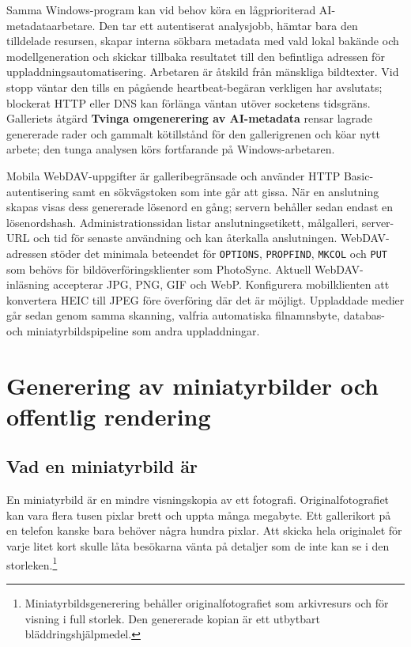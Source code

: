 \documentclass[11pt,a4paper]{article}
\newcommand{\ui}[1]{\textbf{#1}}
\newcommand{\codeword}[1]{\nolinkurl{#1}}
\begin{document}
Samma Windows-program kan vid behov köra en lågprioriterad AI-metadataarbetare.
Den tar ett autentiserat analysjobb, hämtar bara den tilldelade resursen, skapar
interna sökbara metadata med vald lokal bakände och modellgeneration och skickar
tillbaka resultatet till den befintliga adressen för uppladdningsautomatisering.
Arbetaren är åtskild från mänskliga bildtexter. Vid stopp väntar den tills en
pågående heartbeat-begäran verkligen har avslutats; blockerat HTTP eller DNS
kan förlänga väntan utöver socketens tidsgräns. Galleriets åtgärd \ui{Tvinga
omgenerering av AI-metadata} rensar lagrade genererade rader och gammalt
kötillstånd för den gallerigrenen och köar nytt arbete; den tunga analysen körs
fortfarande på Windows-arbetaren.

Mobila WebDAV-uppgifter är galleribegränsade och använder HTTP
Basic-autentisering samt en sökvägstoken som inte går att gissa. När en
anslutning skapas visas dess genererade lösenord en gång; servern behåller sedan
endast en lösenordshash. Administrationssidan listar anslutningsetikett,
målgalleri, server-URL och tid för senaste användning och kan återkalla
anslutningen. WebDAV-adressen stöder det minimala beteendet för
\codeword{OPTIONS}, \codeword{PROPFIND}, \codeword{MKCOL} och \codeword{PUT} som
behövs för bildöverföringsklienter som PhotoSync. Aktuell WebDAV-inläsning
accepterar JPG, PNG, GIF och WebP. Konfigurera mobilklienten att konvertera HEIC
till JPEG före överföring där det är möjligt. Uppladdade medier går sedan genom
samma skanning, valfria automatiska filnamnsbyte, databas- och
miniatyrbildspipeline som andra uppladdningar.
\section{Generering av miniatyrbilder och offentlig rendering}
\label{sec:thumbnails}

\subsection{Vad en miniatyrbild är}

En miniatyrbild är en mindre visningskopia av ett fotografi. Originalfotografiet
kan vara flera tusen pixlar brett och uppta många megabyte. Ett gallerikort på
en telefon kanske bara behöver några hundra pixlar. Att skicka hela originalet
för varje litet kort skulle låta besökarna vänta på detaljer som de inte kan se
i den storleken.\footnote{Miniatyrbildsgenerering behåller originalfotografiet
som arkivresurs och för visning i full storlek. Den genererade kopian är ett
utbytbart bläddringshjälpmedel.}
\end{document}
